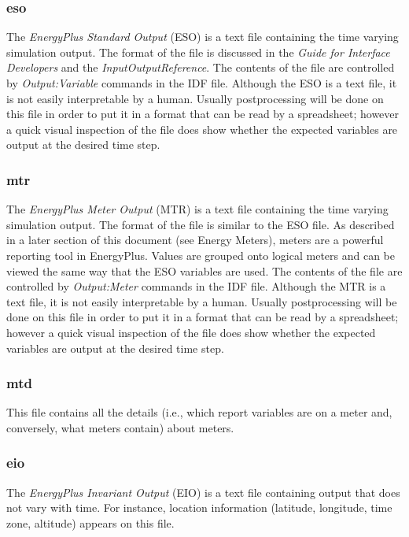 \subsubsection{eso}\label{eso}

The \emph{EnergyPlus Standard Output} (ESO) is a text file containing the time varying simulation output. The format of the file is discussed in the \emph{Guide for Interface Developers} and the \emph{InputOutputReference}. The contents of the file are controlled by \emph{Output:Variable} commands in the IDF file. Although the ESO is a text file, it is not easily interpretable by a human. Usually postprocessing will be done on this file in order to put it in a format that can be read by a spreadsheet; however a quick visual inspection of the file does show whether the expected variables are output at the desired time step.

\subsubsection{mtr}\label{mtr}

The \emph{EnergyPlus Meter Output} (MTR) is a text file containing the time varying simulation output. The format of the file is similar to the ESO file. As described in a later section of this document (see Energy Meters), meters are a powerful reporting tool in EnergyPlus. Values are grouped onto logical meters and can be viewed the same way that the ESO variables are used. The contents of the file are controlled by \emph{Output:Meter} commands in the IDF file. Although the MTR is a text file, it is not easily interpretable by a human. Usually postprocessing will be done on this file in order to put it in a format that can be read by a spreadsheet; however a quick visual inspection of the file does show whether the expected variables are output at the desired time step.

\subsubsection{mtd}\label{mtd}

This file contains all the details (i.e., which report variables are on a meter and, conversely, what meters contain) about meters.

\subsubsection{eio}\label{eio}

The \emph{EnergyPlus Invariant Output} (EIO) is a text file containing output that does not vary with time. For instance, location information (latitude, longitude, time zone, altitude) appears on this file.

